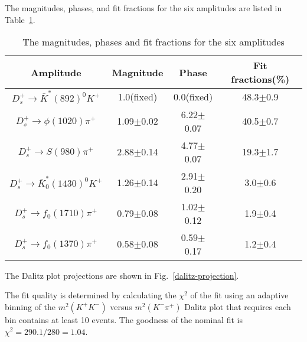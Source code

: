 {The magnitudes, phases, and fit fractions for the six amplitudes are listed in Table~\ref{fit-result}.
\begin{table}[htbp]
    \caption{The magnitudes, phases and fit fractions for the six amplitudes}
    \label{fit-result}
    \begin{center}
    \begin{tabular}{cccc}
        \toprule
        Amplitude & Magnitude  & Phase  & Fit fractions(\%)\\
        \hline
        $D_{s}^{+} \rightarrow \bar{K}^{*}(892)^{0}K^{+}$              & 1.0(fixed)     & 0.0(fixed)    & 48.3$\pm$0.9\\
        $D_{s}^{+} \rightarrow \phi(1020)\pi^{+}$                      & 1.09$\pm$0.02  & 6.22$\pm$0.07 & 40.5$\pm$0.7\\
        $D_{s}^{+} \rightarrow S(980)\pi^{+}$    & 2.88$\pm$0.14  & 4.77$\pm$0.07 & 19.3$\pm$1.7\\
        $D_{s}^{+} \rightarrow \bar{K}^{*}_{0}(1430)^{0}K^{+}$         & 1.26$\pm$0.14  & 2.91$\pm$0.20 & 3.0$\pm$0.6\\
        $D_{s}^{+} \rightarrow f_{0}(1710)\pi^{+}$                     & 0.79$\pm$0.08  & 1.02$\pm$0.12 & 1.9$\pm$0.4\\
        $D_{s}^{+} \rightarrow f_{0}(1370)\pi^{+}$                     & 0.58$\pm$0.08  & 0.59$\pm$0.17 & 1.2$\pm$0.4\\
        \bottomrule
    \end{tabular}
\end{center}
\end{table}

The Dalitz plot projections are shown in Fig.~\ref{dalitz-projection}.
The fit quality is determined by calculating the $\chi^{2}$ of the fit using an adaptive binning of the $m^{2}(K^{+}K^{-})$ versus $m^{2}(K^{-}\pi^{+})$ Dalitz plot that requires each bin contains at least 10 events.
The goodness of the nominal fit is $\chi^{2}=290.1/280=1.04$.  

}
